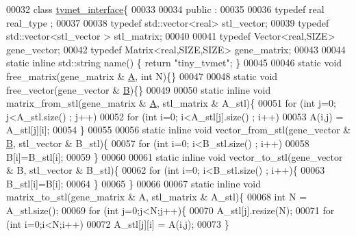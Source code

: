 \begin{DoxyCode}
00032 \textcolor{keyword}{class }\hyperlink{classtvmet__interface}{tvmet\_interface}\{
00033 
00034 public :
00035 
00036   \textcolor{keyword}{typedef} real real\_type ;
00037 
00038   \textcolor{keyword}{typedef} std::vector<real>  stl\_vector;
00039   \textcolor{keyword}{typedef} std::vector<stl\_vector > stl\_matrix;
00040 
00041   \textcolor{keyword}{typedef} Vector<real,SIZE> gene\_vector;
00042   \textcolor{keyword}{typedef} Matrix<real,SIZE,SIZE> gene\_matrix;
00043 
00044   \textcolor{keyword}{static} \textcolor{keyword}{inline} std::string name() \{ \textcolor{keywordflow}{return} \textcolor{stringliteral}{"tiny\_tvmet"}; \}
00045 
00046   \textcolor{keyword}{static} \textcolor{keywordtype}{void} free\_matrix(gene\_matrix & \hyperlink{group___core___module_class_eigen_1_1_matrix}{A}, \textcolor{keywordtype}{int} N)\{\}
00047 
00048   \textcolor{keyword}{static} \textcolor{keywordtype}{void} free\_vector(gene\_vector & \hyperlink{group___core___module_class_eigen_1_1_matrix}{B})\{\}
00049 
00050   \textcolor{keyword}{static} \textcolor{keyword}{inline} \textcolor{keywordtype}{void} matrix\_from\_stl(gene\_matrix & \hyperlink{group___core___module_class_eigen_1_1_matrix}{A}, stl\_matrix & A\_stl)\{
00051     \textcolor{keywordflow}{for} (\textcolor{keywordtype}{int} j=0; j<A\_stl.size() ; j++)
00052       \textcolor{keywordflow}{for} (\textcolor{keywordtype}{int} i=0; i<A\_stl[j].size() ; i++)
00053         A(i,j) = A\_stl[j][i];
00054   \}
00055 
00056   \textcolor{keyword}{static} \textcolor{keyword}{inline} \textcolor{keywordtype}{void} vector\_from\_stl(gene\_vector & \hyperlink{group___core___module_class_eigen_1_1_matrix}{B}, stl\_vector & B\_stl)\{
00057     \textcolor{keywordflow}{for} (\textcolor{keywordtype}{int} i=0; i<B\_stl.size() ; i++)
00058       B[i]=B\_stl[i];
00059   \}
00060 
00061   \textcolor{keyword}{static} \textcolor{keyword}{inline} \textcolor{keywordtype}{void} vector\_to\_stl(gene\_vector & B, stl\_vector & B\_stl)\{
00062     \textcolor{keywordflow}{for} (\textcolor{keywordtype}{int} i=0; i<B\_stl.size() ; i++)\{
00063       B\_stl[i]=B[i];
00064     \}
00065   \}
00066 
00067   \textcolor{keyword}{static} \textcolor{keyword}{inline} \textcolor{keywordtype}{void} matrix\_to\_stl(gene\_matrix & A, stl\_matrix & A\_stl)\{
00068     \textcolor{keywordtype}{int} N = A\_stl.size();
00069     \textcolor{keywordflow}{for} (\textcolor{keywordtype}{int} j=0;j<N;j++)\{
00070       A\_stl[j].resize(N);
00071       \textcolor{keywordflow}{for} (\textcolor{keywordtype}{int} i=0;i<N;i++)
00072         A\_stl[j][i] = A(i,j);
00073     \}

\end{DoxyCode}
